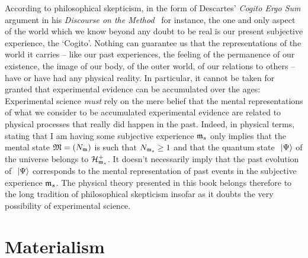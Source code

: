 According to philosophical skepticism, in the form of Descartes' \textit{Cogito Ergo Sum} argument in his \textit{Discourse on the Method}~\cite{Descartes1637} for instance, the one and only aspect of the world which we know beyond any doubt to be real is our present subjective experience, the `Cogito'. Nothing can guarantee us that the representations of the world it carries -- like our past experiences, the feeling of the permanence of our existence, the image of our body, of the outer world, of our relations to others -- have or have had any physical reality. In particular, it cannot be taken for granted that experimental evidence can be accumulated over the ages: Experimental science \textit{must} rely on the mere belief that the mental representations of what we consider to be accumulated experimental evidence are related to physical processes that really did happen in the past. Indeed, in physical terms, stating that I am having some subjective experience $\mathfrak{m}_s$ only implies that the mental state $\mathfrak{M} = ({N}_{\mathfrak{m}})$ is such that ${N}_{\mathfrak{m}_s} \geq 1$ and that the quantum state $\ \left|{\Psi}\right\rangle$ of the universe belongs to $\mathcal H_{\mathfrak{m}_s}^+$. It doesn't necessarily imply that the past evolution of $\ \left|{\Psi}\right\rangle$ corresponds to the mental representation of past events in the subjective experience $\mathfrak{m}_s$. The physical theory presented in this book belongs therefore to the long tradition of philosophical skepticism insofar as it doubts the very possibility of experimental science.




\section{Materialism}

